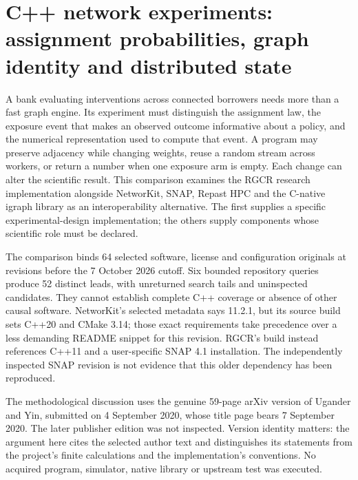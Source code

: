 \section[C++ network experiments]{C++ network experiments: assignment probabilities, graph identity and distributed state}
\label{sec:exec25-cxx-network}

A bank evaluating interventions across connected borrowers needs more than a fast graph engine. Its experiment must distinguish the assignment law, the exposure event that makes an observed outcome informative about a policy, and the numerical representation used to compute that event. A program may preserve adjacency while changing weights, reuse a random stream across workers, or return a number when one exposure arm is empty. Each change can alter the scientific result. This comparison examines the RGCR research implementation alongside NetworKit, SNAP, Repast HPC and the C-native igraph library as an interoperability alternative. The first supplies a specific experimental-design implementation; the others supply components whose scientific role must be declared.\citep{exec25_cnet_rgcr,exec25_cnet_networkit,exec25_cnet_snap,exec25_cnet_repast,exec25_cnet_igraph}

The comparison binds 64 selected software, license and configuration originals at revisions before the 7 October 2026 cutoff. Six bounded repository queries produce 52 distinct leads, with unreturned search tails and uninspected candidates. They cannot establish complete C++ coverage or absence of other causal software. NetworKit's selected metadata says 11.2.1, but its source build sets C++20 and CMake 3.14; those exact requirements take precedence over a less demanding README snippet for this revision. RGCR's build instead references C++11 and a user-specific SNAP 4.1 installation. The independently inspected SNAP revision is not evidence that this older dependency has been reproduced.\citep{exec25_cnet_choice,exec25_cnet_networkit,exec25_cnet_rgcr}

The methodological discussion uses the genuine 59-page arXiv version of Ugander and Yin, submitted on 4 September 2020, whose title page bears 7 September 2020. The later publisher edition was not inspected. Version identity matters: the argument here cites the selected author text and distinguishes its statements from the project's finite calculations and the implementation's conventions. No acquired program, simulator, native library or upstream test was executed.\citep{exec25_cnet_paper,exec25_cnet_choice}

